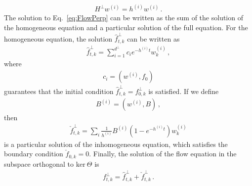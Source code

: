 \documentclass[11pt]{article}
\begin{document}
\begin{align}
    H^\perp w^{(i)} = h^{(i)} w^{(i)}\, .
\end{align}
The solution to Eq.~\eqref{eq:FlowPerp} can be written as the sum of the solution of the 
homogeneous equation and a particular solution of the full equation. For the homogeneous equation, 
the solution $\hat{f}^{\perp}_{t,k}$ can be written as
\begin{align}
    \label{eq:HomoSoln}
    \hat{f}^{\perp}_{t,k} = \sum_{i=1}^{d^\perp} c_i e^{-h^{(i)}t} w^{(i)}_k\, ,
\end{align}
where 
\begin{align}
    \label{eq:InitialCi}
    c_i = \left(w^{(i)}, f_{0}\right)
\end{align}
guarantees that the initial condition $\hat{f}^\perp_{t,k}=f^\perp_{0,k}$ is 
satisfied. If we define
\begin{align}
    \label{eq:BiDef}
    B^{(i)} = \left(w^{(i)}, B\right)\, ,
\end{align}
then 
\begin{align}
    \label{eq:PartSol}
    \check{f}^\perp_{t,k} = \sum_{i} \frac{1}{h^{(i)}} B^{(i)} 
        \left(1 - e^{-h^{(i)}t}\right) w^{(i)}_k
\end{align}
is a particular solution of the inhomogeneous equation, which satisfies the boundary 
condition $\check{f}_{0,k}=0$. Finally, the solution of the flow equation in the subspace orthogonal to 
$\text{ker}\ \Theta$ is 
\begin{align}
    \label{eq:FlowSolution}
    f^\perp_{t,k} = \hat{f}^\perp_{t,k} + \check{f}^\perp_{t,k}\, .
\end{align}



\end{document}
